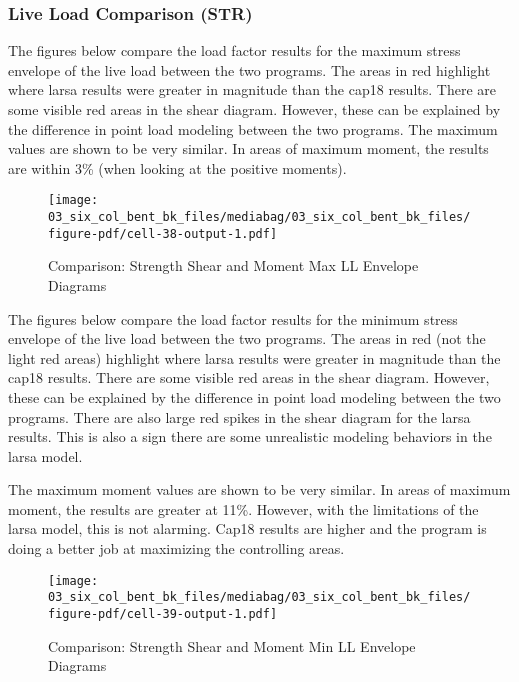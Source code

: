 \documentclass[
  letterpaper,
  DIV=11,
  numbers=noendperiod]{scrartcl}
\begin{document}
\newpage{}

\subsubsection{Live Load Comparison
(STR)}\label{live-load-comparison-str}

The figures below compare the load factor results for the maximum stress
envelope of the live load between the two programs. The areas in red
highlight where larsa results were greater in magnitude than the cap18
results. There are some visible red areas in the shear diagram. However,
these can be explained by the difference in point load modeling between
the two programs. The maximum values are shown to be very similar. In
areas of maximum moment, the results are within 3\% (when looking at the
positive moments).

\begin{figure}[H]

{\centering \texttt{[image: 03\_six\_col\_bent\_bk\_files/mediabag/03\_six\_col\_bent\_bk\_files/figure-pdf/cell-38-output-1.pdf]}

}

\caption{Comparison: Strength Shear and Moment Max LL Envelope Diagrams}

\end{figure}%

\newpage{}

The figures below compare the load factor results for the minimum stress
envelope of the live load between the two programs. The areas in red
(not the light red areas) highlight where larsa results were greater in
magnitude than the cap18 results. There are some visible red areas in
the shear diagram. However, these can be explained by the difference in
point load modeling between the two programs. There are also large red
spikes in the shear diagram for the larsa results. This is also a sign
there are some unrealistic modeling behaviors in the larsa model.

The maximum moment values are shown to be very similar. In areas of
maximum moment, the results are greater at 11\%. However, with the
limitations of the larsa model, this is not alarming. Cap18 results are
higher and the program is doing a better job at maximizing the
controlling areas.

\begin{figure}[H]

{\centering \texttt{[image: 03\_six\_col\_bent\_bk\_files/mediabag/03\_six\_col\_bent\_bk\_files/figure-pdf/cell-39-output-1.pdf]}

}

\caption{Comparison: Strength Shear and Moment Min LL Envelope Diagrams}

\end{figure}%
\end{document}
